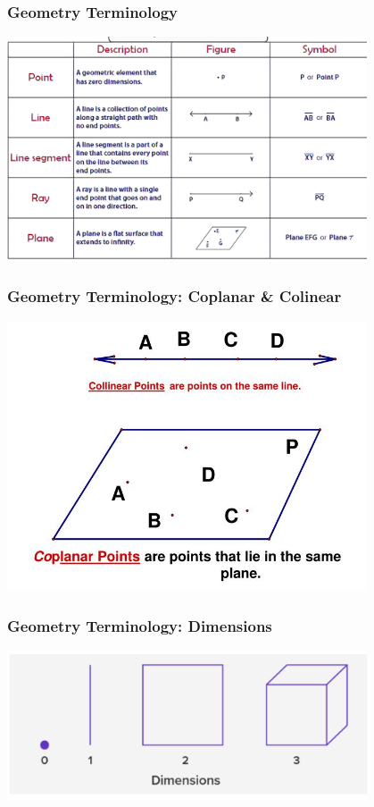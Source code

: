 \documentclass{beamer}
\begin{document}
\begin{frame}
    \frametitle{Geometry Terminology}
    
    \begin{center}
        \includegraphics[width=0.8\textwidth]{geometry.png} %
    \end{center}
\end{frame}
\begin{frame}
    \frametitle{Geometry Terminology: Coplanar \& Colinear}
    \begin{center}
        \includegraphics[width=0.8\textwidth]{coplanar.jpg} %
    \end{center}
\end{frame}

\begin{frame}
    \frametitle{Geometry Terminology: Dimensions}
    \begin{center}
        \includegraphics[width=0.8\textwidth]{dimensions.jpeg} %
    \end{center}
\end{frame}
\end{document}
